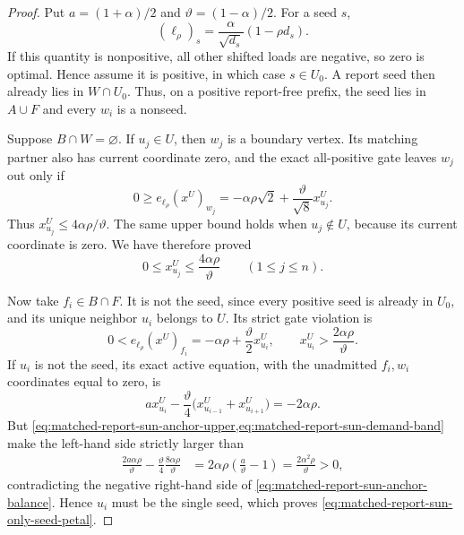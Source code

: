 \begin{proof}
Put $a=(1+\alpha)/2$ and
$\vartheta=(1-\alpha)/2$.  For a seed $s$,
\begin{equation*}
 (\ell_\rho)_s
 =\frac{\alpha}{\sqrt{d_s}}(1-\rho d_s).
\end{equation*}
If this quantity is nonpositive, all other shifted loads are negative, so zero
is optimal.  Hence assume it is positive, in which case $s\in U_0$.  A report
seed then already lies in $W\cap U_0$.  Thus, on a positive report-free
prefix, the seed lies in $A\cup F$ and every $w_i$ is a nonseed.

Suppose $B\cap W=\varnothing$.  If $u_j\in U$, then $w_j$ is a boundary
vertex.  Its matching partner also has current coordinate zero, and the exact
all-positive gate leaves $w_j$ out only if
\begin{equation}
 0\geq e_{\ell_\rho}(x^U)_{w_j}
 =-\alpha\rho\sqrt2+\frac{\vartheta}{\sqrt8}x^U_{u_j}.
\end{equation}
Thus $x^U_{u_j}\leq4\alpha\rho/\vartheta$.  The same upper bound holds when
$u_j\notin U$, because its current coordinate is zero.  We have therefore
proved
\begin{equation}
 0\leq x^U_{u_j}\leq\frac{4\alpha\rho}{\vartheta}
 \qquad(1\leq j\leq n).
 \label{eq:matched-report-sun-anchor-upper}
\end{equation}

Now take $f_i\in B\cap F$.  It is not the seed, since every positive seed is
already in $U_0$, and its unique neighbor $u_i$ belongs to $U$.  Its strict
gate violation is
\begin{equation}
 0<e_{\ell_\rho}(x^U)_{f_i}
 =-\alpha\rho+\frac{\vartheta}{2}x^U_{u_i},
 \qquad
 x^U_{u_i}>\frac{2\alpha\rho}{\vartheta}.
 \label{eq:matched-report-sun-demand-band}
\end{equation}
If $u_i$ is not the seed, its exact active equation, with the unadmitted
$f_i,w_i$ coordinates equal to zero, is
\begin{equation}
 a x^U_{u_i}
 -\frac{\vartheta}{4}
  \bigl(x^U_{u_{i-1}}+x^U_{u_{i+1}}\bigr)
 =-2\alpha\rho.
 \label{eq:matched-report-sun-anchor-balance}
\end{equation}
But \cref{eq:matched-report-sun-anchor-upper,eq:matched-report-sun-demand-band}
make the left-hand side strictly larger than
\begin{align*}
 \frac{2a\alpha\rho}{\vartheta}
 -\frac{\vartheta}{4}\frac{8\alpha\rho}{\vartheta}
 &=2\alpha\rho\left(\frac a\vartheta-1\right)
 =\frac{2\alpha^2\rho}{\vartheta}>0,
\end{align*}
contradicting the negative right-hand side of
\cref{eq:matched-report-sun-anchor-balance}.  Hence $u_i$ must be the single
seed, which proves \cref{eq:matched-report-sun-only-seed-petal}.


\end{proof}
